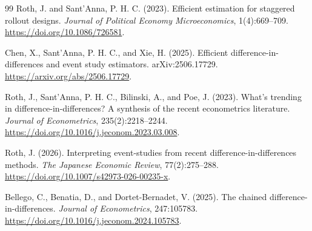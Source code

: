 \documentclass[11pt]{article}
\theoremstyle{definition}
\theoremstyle{plain}
\theoremstyle{remark}
\begin{document}
\begin{thebibliography}{99}
Roth, J. and Sant'Anna, P. H. C. (2023).
Efficient estimation for staggered rollout designs.
\emph{Journal of Political Economy Microeconomics}, 1(4):669--709.
\url{https://doi.org/10.1086/726581}.

Chen, X., Sant'Anna, P. H. C., and Xie, H. (2025).
Efficient difference-in-differences and event study estimators.
arXiv:2506.17729.
\url{https://arxiv.org/abs/2506.17729}.

Roth, J., Sant'Anna, P. H. C., Bilinski, A., and Poe, J. (2023).
What's trending in difference-in-differences? A synthesis of the recent econometrics literature.
\emph{Journal of Econometrics}, 235(2):2218--2244.
\url{https://doi.org/10.1016/j.jeconom.2023.03.008}.

Roth, J. (2026).
Interpreting event-studies from recent difference-in-differences methods.
\emph{The Japanese Economic Review}, 77(2):275--288.
\url{https://doi.org/10.1007/s42973-026-00235-x}.

Bellego, C., Benatia, D., and Dortet-Bernadet, V. (2025).
The chained difference-in-differences.
\emph{Journal of Econometrics}, 247:105783.
\url{https://doi.org/10.1016/j.jeconom.2024.105783}.
\end{thebibliography}
\end{document}
